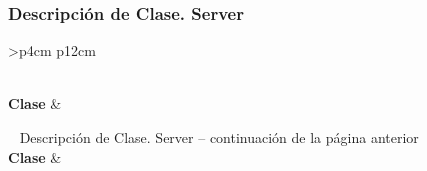 \subsubsection{Descripción de Clase. Server} \label{sec:descripcion_server}
\begin{longtable}{
    >{}p{4cm}
    p{12cm}
    }
    \caption{Descripción de Clase. Server} \label{table:descripcion_server} \\
    \toprule
    \textbf{Clase} &  \\
    \endfirsthead
    
    {{ \tablename\ \thetable{} Descripción de Clase. Server -- continuación de la página anterior}} \\
    \toprule
    \textbf{Clase} &  \\
    \midrule
    \endhead
    
    \midrule
     \\ 
    \endfoot
    
    \bottomrule
    \endlastfoot
    

\end{longtable}
